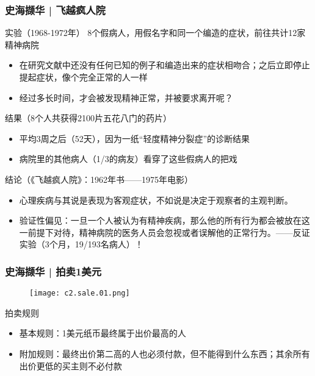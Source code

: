 \begin{frame}
  \frametitle{史海撷华 | 飞越疯人院}
  \vspace{-0.7em}
  \begin{block}{实验（1968-1972年）}
    8个假病人，用假名字和同一个编造的症状，前往共计12家精神病院
    \begin{itemize}
      \item 在研究文献中还没有任何已知的例子和编造出来的症状相吻合；之后立即停止提起症状，像个完全正常的人一样
      \item 经过多长时间，才会被发现精神正常，并被要求离开呢？
    \end{itemize}
  \end{block}
  \vspace{-0.7em}
  \pause
  \begin{block}{结果（8个人共获得2100片五花八门的药片）}
    \begin{itemize}
      \item 平均3周之后（\alert{52天}），因为一纸“轻度精神分裂症”的诊断结果
      \item 病院里的其他病人（1/3的病友）看穿了这些假病人的把戏
    \end{itemize}
  \end{block}
  \vspace{-0.7em}
  \pause
  \begin{block}{结论（《飞越疯人院》：1962年书——1975年电影）}
    \begin{itemize}
      \item 心理疾病与其说是表现为客观症状，不如说是决定于观察者的主观判断。
      \item \alert{验证性偏见}：一旦一个人被认为有精神疾病，那么他的所有行为都会被放在这一前提下对待，精神病院的医务人员会忽视或者误解他的正常行为。——反证实验（3个月，19/193名病人）！
    \end{itemize}
  \end{block}
\end{frame}

\begin{frame}
  \frametitle{史海撷华 | 拍卖1美元}
  \begin{figure}
    \centering
    \texttt{[image: c2.sale.01.png]}
  \end{figure}
  \vspace{-0.8em}
  \pause
  \begin{block}{拍卖规则}
    \begin{itemize}
      \item 基本规则：1美元纸币最终属于出价最高的人
      \item 附加规则：最终出价第二高的人也必须付款，但不能得到什么东西；其余所有出价更低的买主则不必付款
    \end{itemize}
  \end{block}
\end{frame}

